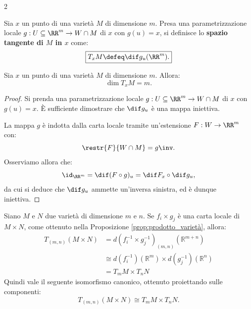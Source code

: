 \begin{multicols*}{2}
    \begin{definition}
        Sia $x$ un punto di una varietà $M$ di dimensione $m$. Presa una
        parametrizzazione locale $g : U \subseteq \RR^m \to W \cap M$ di
        $x$ con $g(u) = x$, si definisce lo \textbf{spazio tangente di $M$ in $x$} come:
        \[
            \boxed{T_x M \defeq \dif g_u(\RR^m).}
        \]
    \end{definition}

    \begin{proposition}
        Sia $x$ un punto di una varietà $M$ di dimensione $m$. Allora:
        \[
            \boxed{\dim T_x M = m.}
        \]
    \end{proposition}

    \begin{proof}
        Si prenda una parametrizzazione locale
        $g : U \subseteq \RR^m \to W \cap M$ di
        $x$ con $g(u) = x$. È sufficiente dimostrare
        che $\dif g_u$ è una mappa iniettiva. \smallskip

        La mappa $g$ è indotta dalla carta locale tramite
        un'estensione $F : W \to \RR^m$ con:
        \[
            \restr{F}{W \cap M} = g\inv.
        \]
        Osserviamo allora che:
        \[
            \id_{\RR^m} = \dif (F \circ g)_u = \dif F_{x} \circ \dif g_u,
        \]
        da cui si deduce che $\dif g_u$ ammette un'inversa sinistra, ed è
        dunque iniettiva.
    \end{proof}

    \begin{remark} \label{rmk:tangente_prodotto}
        Siano $M$ e $N$ due varietà di dimensione $m$ e $n$.
        Se $f_i \times g_j$ è una carta locale di $M \times N$,
        come ottenuto nella Proposizione \ref{prop:prodotto_varietà}, allora:
        \begin{align*}
            T_{(m, n)}(M \times N) & = d(f_i^{-1} \times g_j^{-1})_{(m, n)}(\mathbb{R}^{m+n})         \\
                                   & \cong d(f_i^{-1})(\mathbb{R}^m) \times d(g_j^{-1})(\mathbb{R}^n) \\
                                   & = T_m M \times T_n N
        \end{align*}
        Quindi vale il seguente isomorfismo canonico, ottenuto proiettando sulle componenti:
        \[
            \boxed{T_{(m, n)} (M \times N) \cong T_m M \times T_n N.}
        \]
    \end{remark}


\end{multicols*}
